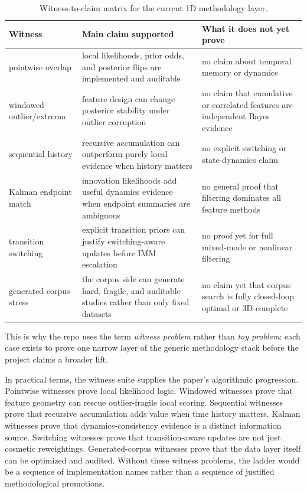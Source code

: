 \documentclass[11pt]{article}
\begin{document}
\begin{table}[htbp]
\centering
\small
\caption{Witness-to-claim matrix for the current 1D methodology layer.}
\label{tab:witness_claim_matrix}
\begin{tabularx}{\textwidth}{lXX}
\toprule
Witness & Main claim supported & What it does not yet prove \\
\midrule
pointwise overlap & local likelihoods, prior odds, and posterior flips are implemented and auditable & no claim about temporal memory or dynamics \\
windowed outlier/extrema & feature design can change posterior stability under outlier corruption & no claim that cumulative or correlated features are independent Bayes evidence \\
sequential history & recursive accumulation can outperform purely local evidence when history matters & no explicit switching or state-dynamics claim \\
Kalman endpoint match & innovation likelihoods add useful dynamics evidence when endpoint summaries are ambiguous & no general proof that filtering dominates all feature methods \\
transition switching & explicit transition priors can justify switching-aware updates before IMM escalation & no proof yet for full mixed-mode or nonlinear filtering \\
generated corpus stress & the corpus side can generate hard, fragile, and auditable studies rather than only fixed datasets & no claim yet that corpus search is fully closed-loop optimal or 3D-complete \\
\bottomrule
\end{tabularx}
\end{table}
This is why the repo uses the term \textit{witness problem} rather than
\textit{toy problem}: each case exists to prove one narrow layer of the generic
methodology stack before the project claims a broader lift.

In practical terms, the witness suite supplies the paper's algorithmic
progression. Pointwise witnesses prove local likelihood logic. Windowed
witnesses prove that feature geometry can rescue outlier-fragile local scoring.
Sequential witnesses prove that recursive accumulation adds value when time
history matters. Kalman witnesses prove that dynamics-consistency evidence is a
distinct information source. Switching witnesses prove that transition-aware
updates are not just cosmetic reweightings. Generated-corpus witnesses prove
that the data layer itself can be optimized and audited. Without these witness
problems, the ladder would be a sequence of implementation names rather than a
sequence of justified methodological promotions.
\end{document}

